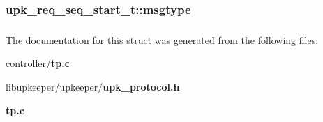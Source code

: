 \subsubsection[{msgtype}]{ {\bf upk\_\-req\_\-seq\_\-start\_\-t::msgtype}}\label{structupk__req__seq__start__t_a01a4014d27c3621a48b050bcd52af09f}
\subsubsection[{UPK\_\-V0\_\-UPK\_\-REQ\_\-SEQ\_\-START\_\-T\_\-FIELDS}]{}\label{structupk__req__seq__start__t_aaa301b5afff419786ec000e1c759b8af}


The documentation for this struct was generated from the following files:\begin{DoxyCompactItemize}
\item 
controller/{\bf tp.c}\item 
libupkeeper/upkeeper/{\bf upk\_\-protocol.h}\item 
{\bf tp.c}\end{DoxyCompactItemize}
